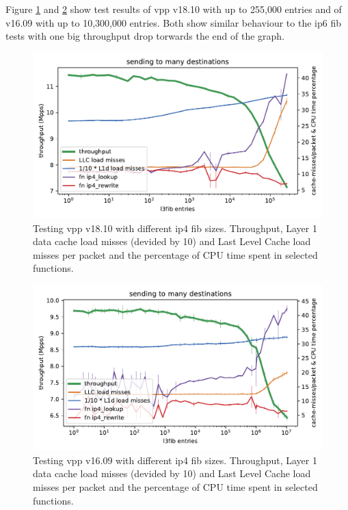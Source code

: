 Figure \ref{graph:ip4fib} and \ref{graph:ip4fiblegacy} show test results of \Ac{vpp} v18.10 with up to 255,000 entries and of v16.09 with up to 10,300,000 entries. Both show similar behaviour to the \Ac{ip6} \Ac{fib} tests with one big throughput drop torwards the end of the graph. 


\begin{figure}[!ht]
\noindent\hspace{0.5mm}\includegraphics[width=\linewidth]{pics/throughput_l3_routes_klaipeda32ghz_v2.pdf}
\caption{Testing \Ac{vpp} v18.10 with different \Ac{ip4} \Ac{fib} sizes. Throughput, Layer 1 data cache load misses (devided by 10) and Last Level Cache load misses per packet and the percentage of CPU time spent in selected functions.}
\label{graph:ip4fib}
\end{figure}

\begin{figure}[!ht]
\noindent\hspace{0.5mm}\includegraphics[width=\linewidth]{pics/throughput_l3_routes_klaipeda_v1609_32ghz_v2.pdf}
\caption{Testing \Ac{vpp} v16.09 with different \Ac{ip4} \Ac{fib} sizes. Throughput, Layer 1 data cache load misses (devided by 10) and Last Level Cache load misses per packet and the percentage of CPU time spent in selected functions. }
\label{graph:ip4fiblegacy}
\end{figure}

